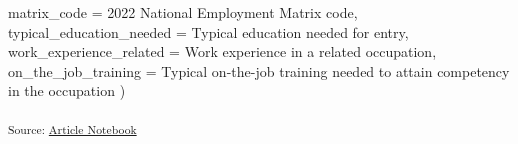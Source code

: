 \documentclass[
  letterpaper,
  DIV=11,
  numbers=noendperiod]{scrartcl}
\newenvironment{Shaded}{\begin{snugshade}}{\end{snugshade}}
\newcommand{\AttributeTok}[1]{\textcolor[rgb]{0.40,0.45,0.13}{#1}}
\newcommand{\NormalTok}[1]{\textcolor[rgb]{0.00,0.23,0.31}{#1}}
\newcommand{\StringTok}[1]{\textcolor[rgb]{0.13,0.47,0.30}{#1}}
\begin{document}
\begin{Shaded}
\begin{Highlighting}[]
    \AttributeTok{matrix\_code =} \StringTok{\textasciigrave{}}\AttributeTok{2022 National Employment Matrix code}\StringTok{\textasciigrave{}}\NormalTok{,}
    \AttributeTok{typical\_education\_needed =} \StringTok{\textasciigrave{}}\AttributeTok{Typical education needed for entry}\StringTok{\textasciigrave{}}\NormalTok{,}
    \AttributeTok{work\_experience\_related =} \StringTok{\textasciigrave{}}\AttributeTok{Work experience in a related occupation}\StringTok{\textasciigrave{}}\NormalTok{,}
    \AttributeTok{on\_the\_job\_training =} \StringTok{\textasciigrave{}}\AttributeTok{Typical on{-}the{-}job training needed to attain competency in the occupation}\StringTok{\textasciigrave{}}
\NormalTok{  )}
\end{Highlighting}
\end{Shaded}

\textsubscript{Source:
\href{https://beeckcenter.github.io/climate-equity-workforce/index-preview.html}{Article
Notebook}}
\end{document}

